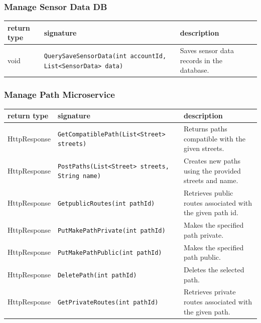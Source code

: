\subsubsection{Manage Sensor Data DB}
\begin{table}[H]
\centering
\small
\begin{tabularx}{\textwidth}{|L{3cm}|L{6.5cm}|Y|}
\hline
\textbf{return type} & \textbf{signature} & \textbf{description} \\
\hline
void & \texttt{QuerySaveSensorData(int accountId, List<SensorData> data)} & Saves sensor data records in the database. \\
\hline
\end{tabularx}
\end{table}
\newpage
\subsubsection{Manage Path Microservice}
\begin{table}[H]
\centering
\small
\begin{tabularx}{\textwidth}{|L{3cm}|L{6.5cm}|Y|}
\hline
\textbf{return type} & \textbf{signature} & \textbf{description} \\
\hline
HttpResponse & \texttt{GetCompatiblePath(List<Street> streets)} & Returns paths compatible with the given streets. \\
\hline
HttpResponse & \texttt{PostPaths(List<Street> streets, String name)} & Creates new paths using the provided streets and name. \\
\hline
HttpResponse & \texttt{GetpublicRoutes(int pathId)} & Retrieves public routes associated with the given path id. \\
\hline
HttpResponse & \texttt{PutMakePathPrivate(int pathId)} & Makes the specified path private. \\
\hline
HttpResponse & \texttt{PutMakePathPublic(int pathId)} & Makes the specified path public. \\
\hline
HttpResponse & \texttt{DeletePath(int pathId)} & Deletes the selected path. \\
\hline
HttpResponse & \texttt{GetPrivateRoutes(int pathId)} & Retrieves private routes associated with the given path. \\
\hline
\end{tabularx}
\end{table}
